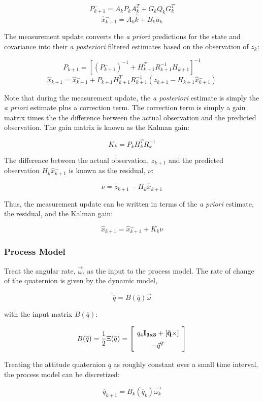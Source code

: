 \documentclass{article}
\newcommand{\mat}[2][ccccccccccccccccccccccccccccccccccccccccccccc]{\left[
        \arraycolsep=4pt\def\arraystretch{1.5}
        \begin{array}{#1} #2 \\ 
        \end{array} 
        \right]}
\begin{document}
\begin{flushleft}
$$ P{^{-}_{k+1}} = A_k P_k A_k^{T} + G_k Q_k G_k^{T} $$
$$ \hat{x}{^{-}_{k+1}} = A_k \hat{k} + B_k u_k $$

The measurement update converts the \textit{a priori} predictions for the state and covariance into their \textit{a posteriori} filtered estimates based on the observation of $z_k$: 

$$ P_{k+1} = [ (P{^{-}_{k+1}})^{-1} + H_{k+1}^{T} R_{k+1}^{-1} H_{k+1} ]^{-1} $$
$$ \hat{x}_{k+1} = \hat{x}{^{-}_{k+1}} + P_{k+1} H_{k+1}^{T} R_{k+1}^{-1} (z_{k+1} - H_{k+1} \hat{x}{^{-}_{k+1}}) $$

Note that during the measurement update, the \textit{a posteriori} estimate is simply the \textit{a priori} estimate plus a correction term. The correction term is simply a gain matrix times the the difference between the actual observation and the predicted observation. The gain matrix is known as the Kalman gain: 

$$ K_k = P_k H_k^{T} R_k^{-1} $$

The difference between the actual observation, $z_{k+1}$ and the predicted observation $H_k \hat{x}{^-_{k+1}}$ is known as the residual, $\nu$:

$$ \nu = z_{k+1} - H_k \hat{x}{^-_{k+1}} $$

Thus, the measurement update can be written in terms of the \textit{a priori} estimate, the residual, and the Kalman gain:

$$ \hat{x}_{k+1} = \hat{x}{^-_{k+1}} + K_k \nu $$

\subsubsection{Process Model}

Treat the angular rate, $\vec{\omega}$, as the input to the process model. The rate of change of the quaternion is given by the dynamic model, 

\[ \dot{\overline{q}} = B(\overline{q}) \vec{\omega} \]

with the input matrix $B(\overline{q})$: 

\[ B(\overline{q}) = \frac{1}{2} \Xi(\overline{q}) = \mat{q_4 \bf{I}_{3x3} + [\vec{q}\times] \\ -\vec{q}^T } \]

Treating the attitude quaternion $\overline{q}$ as roughly constant over a small time interval, the process model can be discretized: 

\[ \overline{q}_{k+1} = B_k(\overline{q}_k) \vec{\omega_k} \]


\end{flushleft}
\end{document}
